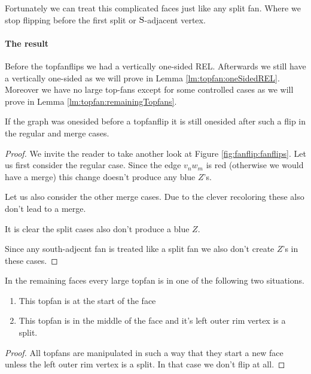 Fortunately we can treat this complicated faces just like any split fan. Where we stop flipping before the first split or $\mathrm{S}$-adjacent vertex.


\paragraph{The result}
Before the topfanflips we had a vertically one-sided REL. Afterwards we still have a vertically one-sided \rel as we will prove in Lemma \ref{lm:topfan:oneSidedREL}. Moreover we have no large top-fans except for some controlled cases as we will prove in Lemma \ref{lm:topfan:remainingTopfans}.

\begin{lemma}
  \label{lm:topfan:oneSidedREL}
  If the graph was onesided before a topfanflip it is still onesided after such a flip in the regular and merge cases.
\end{lemma}
\begin{proof}
  We invite the reader to take another look at Figure \ref{fig:fanflip:fanflips}.
  Let us first consider the regular case. Since the edge  $v_n w_m$ is red (otherwise we would have a merge) this change doesn't produce any blue $Z$'s.

  Let us also consider the other merge cases. Due to the clever recoloring these also don't lead to a merge.

  It is clear the split cases also don't produce a blue $Z$.

  Since any south-adjecnt fan is treated like a split fan we also don't create $Z$'s  in these cases.
\end{proof}


\begin{lemma}
  \label{lm:topfan:remainingTopfans}
  In the remaining faces every large topfan is in one of the following two situations.
  \begin{enumerate}
    \item  This topfan is at the start of the face
    \item  This topfan is in the middle of the face and it's left outer rim vertex is a split.
  \end{enumerate}
\end{lemma}
\begin{proof}
  All topfans are manipulated in such a way that they start a new face unless the left outer rim vertex is a split. In that case we don't flip at all.
\end{proof}
